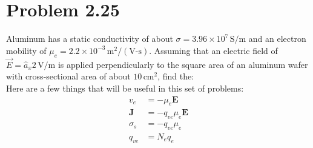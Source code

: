 \documentclass[12pt]{article}
\begin{document}
\section*{Problem 2.25}
Aluminum has a static conductivity of about \( \sigma = 3.96 \times 10^7 \, \text{S/m} \) and an electron mobility of \( \mu_e = 2.2 \times 10^{-3} \, \text{m}^2/(\text{V-s}) \). Assuming that an electric field of \( \vec{E} = \hat{a}_x 2 \, \text{V/m} \) is applied perpendicularly to the square area of an aluminum wafer with cross-sectional area of about \( 10 \, \text{cm}^2 \), find the:\\
 Here are a few things that will be useful in this set of problems:
  \begin{align*}
    v_e &= -\mu_e\bm{E}\\
    \bm{J} &= -q_{ve}\mu_e\bm{E}\\
    \sigma_s &= -q_{ve}\mu_e\\
    q_{ve} &= N_eq_e
  \end{align*}
\end{document}
